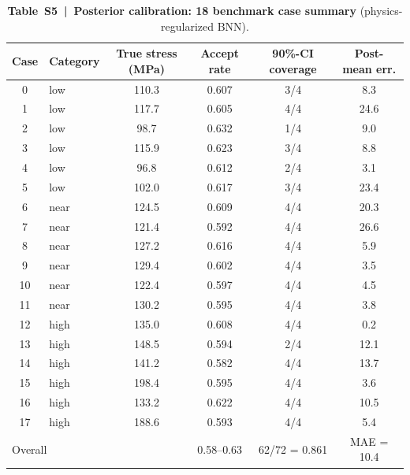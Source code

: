 \documentclass[11pt,a4paper]{article}
\begin{document}
\begin{table}[htbp]
\centering
\caption{\textbf{Table~S5~|~Posterior calibration: 18 benchmark case
summary} (physics-regularized BNN).}
\label{tab:S5}
\smallskip
\small
\begin{tabular}{clcccc}
\toprule
Case & Category & True stress (MPa) & Accept rate & 90\%-CI coverage & Post-mean err. \\
\midrule
 0 & low  & 110.3 & 0.607 & 3/4 &  8.3 \\
 1 & low  & 117.7 & 0.605 & 4/4 & 24.6 \\
 2 & low  &  98.7 & 0.632 & 1/4 &  9.0 \\
 3 & low  & 115.9 & 0.623 & 3/4 &  8.8 \\
 4 & low  &  96.8 & 0.612 & 2/4 &  3.1 \\
 5 & low  & 102.0 & 0.617 & 3/4 & 23.4 \\
 6 & near & 124.5 & 0.609 & 4/4 & 20.3 \\
 7 & near & 121.4 & 0.592 & 4/4 & 26.6 \\
 8 & near & 127.2 & 0.616 & 4/4 &  5.9 \\
 9 & near & 129.4 & 0.602 & 4/4 &  3.5 \\
10 & near & 122.4 & 0.597 & 4/4 &  4.5 \\
11 & near & 130.2 & 0.595 & 4/4 &  3.8 \\
12 & high & 135.0 & 0.608 & 4/4 &  0.2 \\
13 & high & 148.5 & 0.594 & 2/4 & 12.1 \\
14 & high & 141.2 & 0.582 & 4/4 & 13.7 \\
15 & high & 198.4 & 0.595 & 4/4 &  3.6 \\
16 & high & 133.2 & 0.622 & 4/4 & 10.5 \\
17 & high & 188.6 & 0.593 & 4/4 &  5.4 \\
\midrule
\multicolumn{2}{l}{Overall} & & 0.58--0.63 & 62/72 = 0.861 & MAE = 10.4 \\
\bottomrule
\end{tabular}
\end{table}
\end{document}

